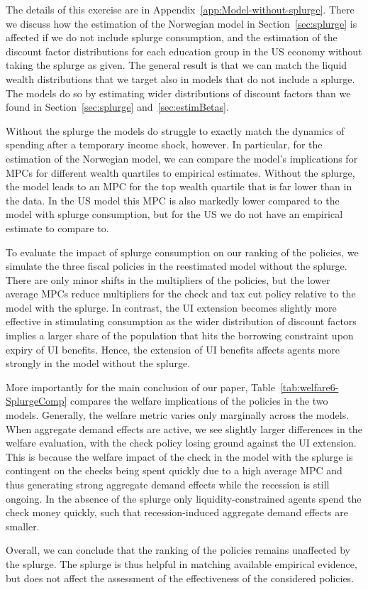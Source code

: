 \documentclass[\latexroot/\projectname]{subfiles}
\begin{document}
The details of this exercise are in Appendix~\ref{app:Model-without-splurge}.
There we discuss how the estimation of the Norwegian model in Section~\ref{sec:splurge} is affected if we do not include splurge consumption, and the estimation of the discount factor distributions for each education group in the US economy without taking the splurge as given.
The general result is that we can match the liquid wealth distributions that we target also in models that do not include a splurge.
The models do so by estimating wider distributions of discount factors than we found in Section~\ref{sec:splurge} and~\ref{sec:estimBetas}.

Without the splurge the models do struggle to exactly match the dynamics of spending after a temporary income shock, however.
In particular, for the estimation of the Norwegian model, we can compare the model's implications for MPCs for different wealth quartiles to empirical estimates.
Without the splurge, the model leads to an MPC for the top wealth quartile that is far lower than in the data.
In the US model this MPC is also markedly lower compared to the model with splurge consumption, but for the US we do not have an empirical estimate to compare to.

To evaluate the impact of splurge consumption on our ranking of the policies, we simulate the three fiscal policies in the reestimated model without the splurge.
There are only minor shifts in the multipliers of the policies, but the lower average MPCs reduce multipliers for the check and tax cut policy relative to the model with the splurge.
In contrast, the UI extension becomes slightly more effective in stimulating consumption as the wider distribution of discount factors implies a larger share of the population that hits the borrowing constraint upon expiry of UI benefits.
Hence, the extension of UI benefits affects agents more strongly in the model without the splurge.

More importantly for the main conclusion of our paper, Table~\ref{tab:welfare6-SplurgeComp} compares the welfare implications of the policies in the two models.
Generally, the welfare metric varies only marginally across the models.
When aggregate demand effects are active, we see slightly larger differences in the welfare evaluation, with the check policy losing ground against the UI extension.
This is because the welfare impact of the check in the model with the splurge is contingent on the checks being spent quickly due to a high average MPC and thus generating strong aggregate demand effects while the recession is still ongoing.
In the absence of the splurge only liquidity-constrained agents spend the check money quickly, such that recession-induced aggregate demand effects are smaller.



Overall, we can conclude that the ranking of the policies remains unaffected by the splurge.
The splurge is thus helpful in matching available empirical evidence, but does not affect the assessment of the effectiveness of the considered policies.

\smartbib
\end{document}
